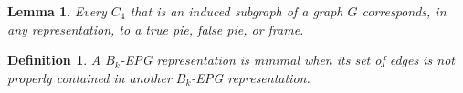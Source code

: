 \documentclass[preprint,12pt]{elsarticle} %
\newtheorem{lema}[theorem]{Lemma}
\newtheorem{defi}[theorem]{Definition}
\begin{document}
%


\begin{lema}\label{lem:representacaoC4}
\citep{golumbic2009} Every  $C_4$ that is an induced subgraph of a graph $ G $ corresponds, in any representation, to a true pie, false pie, or frame.
\end{lema}




\begin{defi}
A $B_k$-EPG representation is \emph{minimal} 
when its set of edges  is not properly contained in another $B_k$-EPG representation. 
\end{defi}
\end{document}
